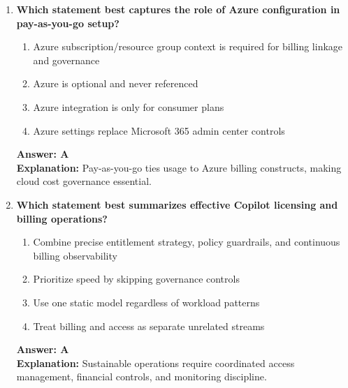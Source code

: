 \documentclass[10pt]{article}
\begin{document}
\begin{enumerate}[leftmargin=*]
\item \textbf{Which statement best captures the role of Azure configuration in pay-as-you-go setup?}
\begin{enumerate}[label=\Alph*.]
  \item Azure subscription/resource group context is required for billing linkage and governance
  \item Azure is optional and never referenced
  \item Azure integration is only for consumer plans
  \item Azure settings replace Microsoft 365 admin center controls
\end{enumerate}
\textbf{Answer: A}\\
\textbf{Explanation:} Pay-as-you-go ties usage to Azure billing constructs, making cloud cost governance essential.

\item \textbf{Which statement best summarizes effective Copilot licensing and billing operations?}
\begin{enumerate}[label=\Alph*.]
  \item Combine precise entitlement strategy, policy guardrails, and continuous billing observability
  \item Prioritize speed by skipping governance controls
  \item Use one static model regardless of workload patterns
  \item Treat billing and access as separate unrelated streams
\end{enumerate}
\textbf{Answer: A}\\
\textbf{Explanation:} Sustainable operations require coordinated access management, financial controls, and monitoring discipline.

\end{enumerate}


\clearpage
\end{document}
